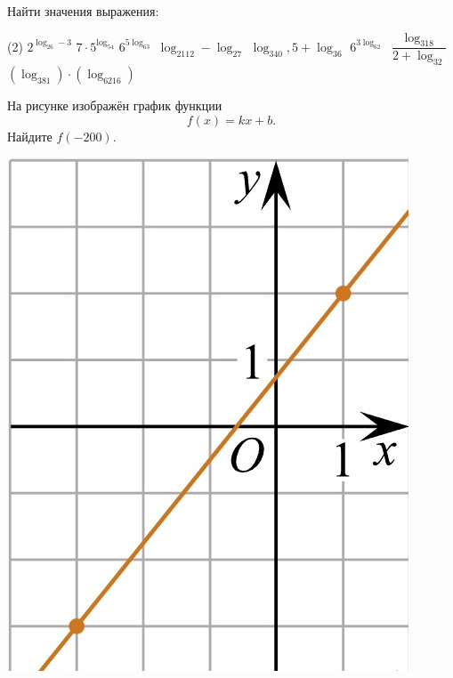 \begin{homework}[number=1]
	\begin{listofex}
		\item  Найти значения выражения:
		\begin{tasks}(2)
			\task \( 2^{\log_26-3} \)
			\task \( 7\cdot5^{\log_54} \)
			\task \( 6^{5\log_63} \)
			\task \( \log_2112-\log_27 \)
			\task \( \log_340,5+\log_36 \)
			\task \( 6^{3\log_62} \)
			\task \( \dfrac{\log_318}{2+\log_32} \)
			\task \( (\log_381)\cdot(\log_6216) \)
		\end{tasks}
		\item 	
			\begin{minipage}[t]{\bodywidth}
			На рисунке изображён график функции \[ f(x)=kx+b. \] Найдите \(f(-200)\).
		\end{minipage}
		\hspace{0.02\linewidth}
		\begin{minipage}[t]{\picwidth}
			\includegraphics[align=t, width=\linewidth]{../../pics/G101M4C4-1}

\end{minipage}
\end{listofex}
\end{homework}
